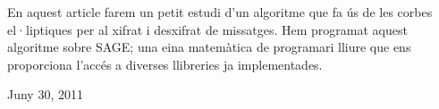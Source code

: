 \documentclass[journal]{IEEEtran}
\begin{document}
En aquest article farem un petit estudi d'un algoritme que fa ús de les 
corbes el·liptiques per al xifrat i desxifrat de missatges. Hem programat aquest algoritme sobre SAGE; una eina matemàtica de programari lliure que ens proporciona l'accés a diverses llibreries ja implementades.


 
\hfill Juny 30, 2011



%
%



%
%
\end{document}
